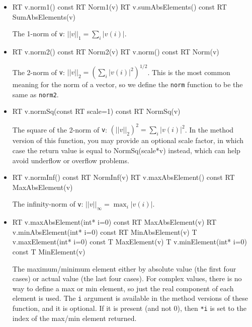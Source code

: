 \documentclass[twoside,letterpaper,11pt]{article}
\renewcommand{\tt}[1]{{\lstinline {#1}}}
\begin{document}
\begin{itemize}

\item
\begin{tmvcode}
RT v.norm1() const
RT Norm1(v)
RT v.sumAbsElements() const
RT SumAbsElements(v)
\end{tmvcode}
The 1-norm of \tt{v}: $||v||_1 = \sum_i |v(i)|$.

\item
\begin{tmvcode}
RT v.norm2() const
RT Norm2(v)
RT v.norm() const
RT Norm(v)
\end{tmvcode}
The 2-norm of \tt{v}: $||v||_2 = (\sum_i |v(i)|^2)^{1/2}$.
This is the most common meaning for the norm of a vector, so we
define the \tt{norm} function to be the same as \tt{norm2}.

\item
\begin{tmvcode}
RT v.normSq(const RT scale=1) const
RT NormSq(v)
\end{tmvcode}
The square of the 2-norm of \tt{v}: $(||v||_2)^2 = \sum_i |v(i)|^2$.
In the method version of this function, you may provide an optional scale factor,
in which case the return value is equal to NormSq(scale*v) instead, 
which can help avoid underflow or overflow problems.

\item
\begin{tmvcode}
RT v.normInf() const
RT NormInf(v)
RT v.maxAbsElement() const
RT MaxAbsElement(v)
\end{tmvcode}
The infinity-norm of \tt{v}: $||v||_\infty = \max_i |v(i)|$.

\item
\begin{tmvcode}
RT v.maxAbsElement(int* i=0) const
RT MaxAbsElement(v)
RT v.minAbsElement(int* i=0) const
RT MinAbsElement(v)
T v.maxElement(int* i=0) const
T MaxElement(v)
T v.minElement(int* i=0) const
T MinElement(v)
\end{tmvcode}
The maximum/minimum element either by absolute value (the first four cases) or actual value
(the last four cases).  For complex values, there is no way to define a 
max or min element, so just the real component of each element is used.
The \tt{i} argument is available in the method versions of these function, and it is optional.
If it is present (and not 0), then \tt{*i} is set to the 
index of the max/min element returned.


\end{itemize}
\end{document}
